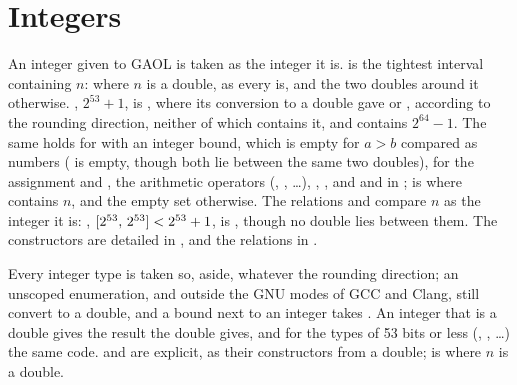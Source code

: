 \documentclass[12pt,a4paper,twoside,openright]{book}
\begin{document}
\section{Integers}\label{sec:integers}
%

An integer given to GAOL is taken as the integer it is.\newinvfive{}
 is the tightest interval containing $n$:  where
$n$ is a double, as every  is, and the two doubles around it
otherwise. , $2^{53}+1$, is
, where its conversion to a double gave
 or , according to the rounding
direction, neither of which contains it, and 
contains $2^{64}-1$. The same holds for  with an integer
bound, which is empty for $a>b$ compared as numbers
( is empty, though both
lie between the same two doubles), for the assignment  and
, the arithmetic operators (, ,
\ldots), , , and
 and  in ;
 is  where  contains $n$, and the empty
set otherwise. The relations and  compare $n$
as the integer it is: ,
$[2^{53},\,2^{53}]<2^{53}+1$, is , though no double lies between
them. The constructors are detailed in , and the
relations in .

\medskip
Every integer type is taken so,  aside, whatever the rounding
direction; an unscoped enumeration, and  outside the GNU
modes of GCC and Clang, still convert to a double, and a 
bound next to an integer takes . An integer
that is a double gives the result the double gives, and for the types of 53
bits or less (, , \ldots) the same code.
 and  are explicit, as their
constructors from a double;  is 
where $n$ is a double.
\end{document}
